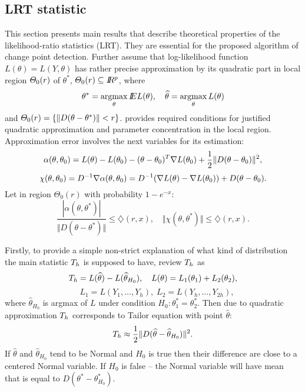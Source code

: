 \label{sec:theory}
\subsection{LRT statistic}
This section presents main results that describe theoretical properties of the likelihood-ratio statistics (LRT). They are essential for the proposed algorithm of change point detection. Further assume that log-likelihood function $L(\theta) = L(Y,\theta)$ has rather precise approximation by its quadratic part in local region $\varTheta_0(r)$  of $\theta^*$, $\varTheta_0(r) \subseteq I\!\!R^p$, where
\[
\theta^* = \argmax_{\theta} \E L(\theta),
\quad
\widehat{\theta} = \argmax_{\theta} L(\theta)
\]
and $\varTheta_0(r) = \{\Vert D (\theta - \theta^*) \Vert < r \}$. \cite{wilks2013} provides required conditions for justified quadratic approximation and parameter concentration in the local region.
Approximation error involves the next variables for its estimation:
\[
  \alpha(\theta, \theta_0) = L(\theta) - L(\theta_0)   - (\theta - \theta_0)^T \nabla L( \theta_0) +  \frac{1}{2} \Vert D (\theta - \theta_0) \Vert^2, 
\]
\[
\chi(\theta, \theta_0) = D^{-1} \nabla \alpha(\theta, \theta_0) 
= D^{-1} (\nabla L(\theta) - \nabla L( \theta_0) ) +  D (\theta - \theta_0). 
\]
Let  in region $\Theta_0(r)$ with probability $1 - e^{-x}$:
\begin{equation}\label{cond_A}\tag{A}
\frac{| \alpha(\theta, \theta^*)  |}{\Vert D(\theta - \theta^*) \Vert} \leq \diamondsuit (r, x),  
\quad
  \Vert \chi(\theta, \theta^*) \Vert \leq  \diamondsuit (r, x).
\end{equation}

Firstly, to provide a simple non-strict explanation of what kind of distribution the main statistic  $T_h$ is supposed to have, review  $T_h$ as
\[
T_h = L(\widehat{\theta}) -  L(\widehat{\theta}_{H_0}), 
\quad L(\theta) = L_1(\theta_1) + L_2(\theta_2), 
\]
\[
\quad L_1 = L(Y_1,\ldots,Y_h), \; L_2 = L(Y_h,\ldots,Y_{2h}), 
\]
where $\widehat{\theta}_{H_0}$ is argmax of $L$ under condition $H_0: \theta_1^* = \theta_2^*$. Then due to quadratic approximation $T_h$  corresponds to Tailor equation with point $\widehat{\theta}$:
\[
T_h \approx \frac{1}{2} \Vert D(\widehat{\theta} - \widehat{\theta}_{H_0})  \Vert^2.
\]   
If $\widehat{\theta}$ and $\widehat{\theta}_{H_0}$ tend to be Normal and $H_0$ is true then their difference are close to a centered Normal variable. If $H_0$ is false -- the Normal variable will have mean that  is equal to $D(\theta^* - \theta_{H_0}^*)$. 

